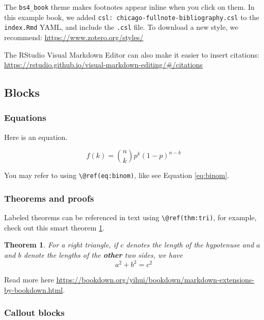 \documentclass[
]{bxjsbook}
\newtheorem{theorem}{Theorem}[section]
\theoremstyle{definition}
\theoremstyle{definition}
\theoremstyle{definition}
\theoremstyle{definition}
\theoremstyle{remark}
\begin{document}
The \texttt{bs4\_book} theme makes footnotes appear inline when you click on them. In this example book, we added \texttt{csl:\ chicago-fullnote-bibliography.csl} to the \texttt{index.Rmd} YAML, and include the \texttt{.csl} file. To download a new style, we recommend: \url{https://www.zotero.org/styles/}

The RStudio Visual Markdown Editor can also make it easier to insert citations: \url{https://rstudio.github.io/visual-markdown-editing/\#/citations}

\hypertarget{blocks}{%
\subsection{Blocks}\label{blocks}}

\hypertarget{equations}{%
\subsubsection{Equations}\label{equations}}

Here is an equation.

\begin{equation} 
  f\left(k\right) = \binom{n}{k} p^k\left(1-p\right)^{n-k}
  \label{eq:binom}
\end{equation}

You may refer to using \texttt{\textbackslash{}@ref(eq:binom)}, like see Equation \eqref{eq:binom}.

\hypertarget{theorems-and-proofs}{%
\subsubsection{Theorems and proofs}\label{theorems-and-proofs}}

Labeled theorems can be referenced in text using \texttt{\textbackslash{}@ref(thm:tri)}, for example, check out this smart theorem \ref{thm:tri}.

\begin{theorem}
\protect\hypertarget{thm:tri}{}\label{thm:tri}For a right triangle, if \(c\) denotes the \emph{length} of the hypotenuse
and \(a\) and \(b\) denote the lengths of the \textbf{other} two sides, we have
\[a^2 + b^2 = c^2\]
\end{theorem}

Read more here \url{https://bookdown.org/yihui/bookdown/markdown-extensions-by-bookdown.html}.

\hypertarget{callout-blocks}{%
\subsubsection{Callout blocks}\label{callout-blocks}}
\end{document}
